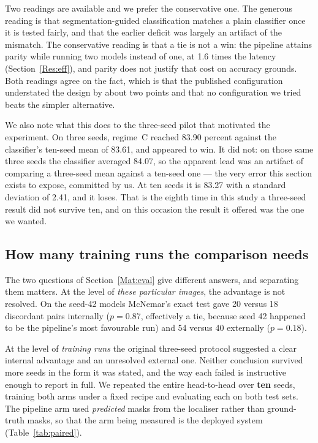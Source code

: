 \documentclass{melba}
\begin{document}
Two readings are available and we prefer the conservative one. The generous reading is that segmentation-guided classification matches a plain classifier once it is tested fairly, and that the earlier deficit was largely an artifact of the mismatch. The conservative reading is that a tie is not a win: the pipeline attains parity while running two models instead of one, at 1.6 times the latency (Section~\ref{Res:eff}), and parity does not justify that cost on accuracy grounds. Both readings agree on the fact, which is that the published configuration understated the design by about two points and that no configuration we tried beats the simpler alternative.

We also note what this does to the three-seed pilot that motivated the experiment. On three seeds, regime~C reached 83.90 percent against the classifier's ten-seed mean of 83.61, and appeared to win. It did not: on those same three seeds the classifier averaged 84.07, so the apparent lead was an artifact of comparing a three-seed mean against a ten-seed one --- the very error this section exists to expose, committed by us. At ten seeds it is 83.27 with a standard deviation of 2.41, and it loses. That is the eighth time in this study a three-seed result did not survive ten, and on this occasion the result it offered was the one we wanted.

\subsection{How many training runs the comparison needs}
\label{Res:stat}
The two questions of Section~\ref{Mat:eval} give different answers, and separating them matters. At the level of \emph{these particular images}, the advantage is not resolved. On the seed-42 models McNemar's exact test gave 20 versus 18 discordant pairs internally ($p=0.87$, effectively a tie, because seed 42 happened to be the pipeline's most favourable run) and 54 versus 40 externally ($p=0.18$).

At the level of \emph{training runs} the original three-seed protocol suggested a clear internal advantage and an unresolved external one. Neither conclusion survived more seeds in the form it was stated, and the way each failed is instructive enough to report in full. We repeated the entire head-to-head over \textbf{ten} seeds, training both arms under a fixed recipe and evaluating each on both test sets. The pipeline arm used \emph{predicted} masks from the localiser rather than ground-truth masks, so that the arm being measured is the deployed system (Table~\ref{tab:paired}).
\end{document}
